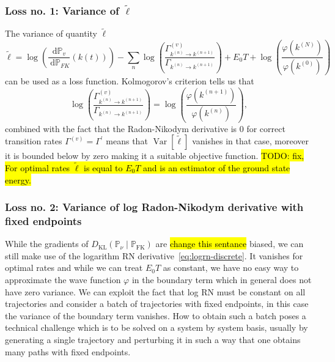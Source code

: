 \subsubsection{Loss no. 1: Variance of $\tilde \ell$}
The variance of quantity $\tilde{\ell}$
\begin{equation}
	\tilde{\ell}=
	\log \left(\frac{\mathrm{d} \mathbb{P}_{v}}{\mathrm{~d} \mathbb{P}_{F K}}(k(t))\right)
	-\sum_{n} \log \left(\frac{\Gamma^{(v)}_{k^{(n)} \rightarrow k^{(n+1)}}}{\Gamma_{k^{(n)} \rightarrow k^{(n+1)}}}\right)
	+E_{0} T
	+\log \left(\frac{\varphi\left(k^{(N)}\right)}{\varphi\left(k^{(0)}\right)}\right)
\end{equation}
 can be used as a loss function. Kolmogorov's criterion tells us that
 \begin{equation}
 	\log \left(\frac{\Gamma_{k^{(n)} \rightarrow k^{(n+1)}}^{(v)}}{\Gamma_{k^{(n)} \rightarrow k^{(n+1)}}}\right)=\log \left(\frac{\varphi(k^{(n+1)})}{\varphi(k^{(n)})}\right),
 \end{equation}
 combined with the fact that the Radon-Nikodym derivative is $0$ for correct transition rates $\Gamma^{(v)} = \Gamma^\prime$ means that $\operatorname{Var}[\tilde{\ell}]$ vanishes in that case, moreover it is bounded below by zero making it a suitable objective function. \hl{TODO: fix, For optimal rates $\tilde \ell$ is equal to $E_0 T$ and is an estimator of the ground state energy.}
 
\subsubsection{Loss no. 2: Variance of log Radon-Nikodym derivative with fixed endpoints}
While the gradients of $D_{\mathrm{KL}}\left(\mathbb{P}_{\nu} \mid \mathbb{P}_{\mathrm{FK}}\right)$ are \hl{change this sentance} biased, we can still make use of the logarithm RN derivative~\eqref{eq:logrn-discrete}. It vanishes for optimal rates and while we can treat $E_0 T$ as constant, we have no easy way to approximate the wave function $\varphi$ in the boundary term which in general does not have zero variance. We can exploit the fact that log RN must be constant on all trajectories and consider a batch of trajectories with fixed endpoints, in this case the variance of the boundary term vanishes. How to obtain such a batch poses a technical challenge which is to be solved on a system by system basis, usually by generating a single trajectory and perturbing it in such a way that one obtains many paths with fixed endpoints.


